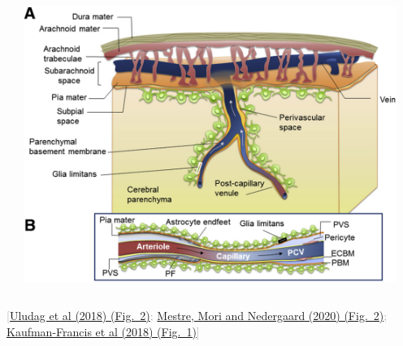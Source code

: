 \documentclass[mathserif, aspectratio=169]{beamer}
\newcommand{\refer}[1]{\begin{flushright}{\tiny \textcolor{darkgray}{[#1]}}\end{flushright}}
\begin{document}
\begin{frame}
\begin{columns}[c]
\begin{column}{0.4\textwidth}
\begin{center}
      \end{center}
      \end{column}
      \begin{column}{0.6\textwidth}
      \begin{center}
        \includegraphics[width=0.95\textwidth]{graphics/kaufmanfrancis_et_al_2018_fig1.jpg}
      \end{center}
      \end{column}
  \end{columns}
  \refer{\href{https://doi.org/10.1016/j.neuroimage.2017.02.063}{Uludag et al (2018) (Fig.~2)}; \href{https://doi.org/10.1016/j.tins.2020.04.003}{Mestre, Mori and Nedergaard (2020) (Fig.~2)}; \href{https://doi.org/10.1016/j.ajpath.2018.03.015}{Kaufman-Francis et al (2018) (Fig.~1)}}
\end{frame}
\end{document}
